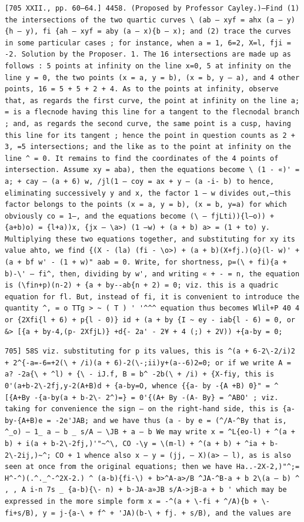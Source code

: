 \documentclass[11pt,a4paper]{book}
\begin{document}
\newpage
\setcounter{page}{582}
\begin{verbatim}
[705 XXII., pp. 60—64.] 4458. (Proposed by Professor Cayley.)—Find (1) the intersections of the two quartic curves \ (ab — xyf = ahx (a — y){h — y), fi {ah — xyf = aby (a — x){b — x); and (2) trace the curves in some particular cases ; for instance, when a = 1, 6=2, X=l, fji = -2. Solution by the Proposer. 1. The 16 intersections are made up as follows : 5 points at infinity on the line x=0, 5 at infinity on the line y = 0, the two points (x = a, y = b), (x = b, y — a), and 4 other points, 16 = 5 + 5 + 2 + 4. As to the points at infinity, observe that, as regards the first curve, the point at infinity on the line a; = is a flecnode having this line for a tangent to the flecnodal branch ; and, as regards the second curve, the same point is a cusp, having this line for its tangent ; hence the point in question counts as 2 + 3, =5 intersections; and the like as to the point at infinity on the line ^ = 0. It remains to find the coordinates of the 4 points of intersection. Assume xy = aba), then the equations become \ (1 - «)' = a; + cay — (a + 6) w, /jl(1 — coy = ax + y — (a -i- b) to hence, eliminating successively y and x, the factor 1 — w divides out,—this factor belongs to the points (x = a, y = b), (x = b, y=a) for which obviously co = 1—, and the equations become (\ — fjLti)){l—o)) + {a+b)o) = {l+a))x, {jx — \a>) (1 —w) + (a + b) a> = (1 + to) y. Multiplying these two equations together, and substituting for xy its value ahto, we find {(X - (la) (fi - \o>) + (a + b)(X+fj.)(o}(l- w)' + (a + bf w' - (1 + w)" aab = 0. Write, for shortness, p=(\ + fi){a + b)-\' — fi^, then, dividing by w', and writing « + - = n, the equation is (\fin+p)(n-2) + {a + by--ab{n + 2) = 0; viz. this is a quadric equation for fl. But, instead of fi, it is convenient to introduce the quantity ^, = o TTg > ~ ( T ) ' '^^^ equation thus becomes Wlil+P 40 4 or {2Xfi{l + 6) + p{l - 0)} id + (a + by {I ~ ey - iab{l - 6) = 0, or &> [{a + by-4,(p- 2XfjL)} +d{- 2a' - 2¥ + 4 (;) + 2V)) +{a-by = 0; 
\end{verbatim}

\newpage
\setcounter{page}{583}
\begin{verbatim}
705] 58S viz. substituting for p its values, this is ^(a + 6-2\-2/i)2 + 2^{-a=-6=+2(\ + /i)(a + 6)-2(\-;ii)y+(a--6)2=0; or if we write A = a? -2a{\ + ^l) + {\ - iJ.f, B = b^ -2b(\ + /i) + {X-fiy, this is 0'(a+b-2\-2fj,y-2(A+B)d + {a-by=O, whence {{a- by -{A +B) 0}" = ^ [{A+By -{a-by(a + b-2\- 2^)=} = 0'{(A+ By -(A- By} = ^ABO' ; viz. taking for convenience the sign — on the right-hand side, this is {a-by-{A+B)e = -2e'JAB; and we have thus (a - by e = (^/A-^By that is, ^_o) — 1_ a — b _ s/A — \JB + a — b We may write x = ^L{eo-l) + ^(a + b) + i(a + b-2\-2fj,)'"~^\, CO -\y = \(m-l) + ^(a + b) + ^ia + b-2\-2ij,)~^; CO + 1 whence also x — y = (jj, — X)(a> — l), as is also seen at once from the original equations; then we have Ha..-2X-2,)"^;= H^-^)(.^._^-^2X-2.) ^ (a-b){fi-\) + b>^A-a>/B ^JA-^B-a + b 2\(a — b) ^ , , A i-n 7s _ {a-b){\- n) + b-JA-a»JB s/A->jB-a + b ' which may be expressed in the more simple form x = -^(a + \-fi + ^/A){b + \-fi+s/B), y = j-{a-\ + f^ + 'JA)(b-\ + fj. + s/B), and the values are 
\end{verbatim}
\end{document}
